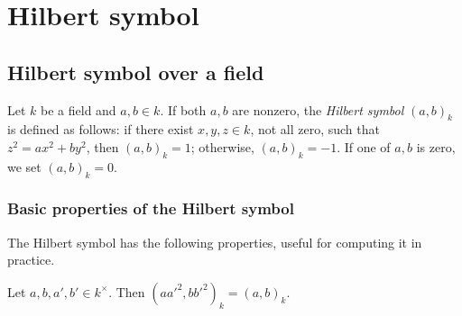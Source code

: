 
%







\printbibliography

\chapter{Hilbert symbol}

\section{Hilbert symbol over a field}

\begin{definition}
	\label{def:Hilbert_symbol}
	\leanok
	Let $k$ be a field and $a, b \in k$. If both $a,b$ are nonzero, the \emph{Hilbert symbol} $(a, b)_k$ is defined as
	follows: if there exist $x, y, z \in k$, not all zero, such that $z^2 = ax^2 + by^2$,
	then $(a, b)_k = 1$; otherwise, $(a, b)_k = -1$. If one of $a,b$ is zero, we set $(a, b)_k = 0$.
\end{definition}


\subsection{Basic properties of the Hilbert symbol}

The Hilbert symbol has the following properties, useful for computing it in practice.

\begin{lemma}
	\label{lem:well_defined_up_to_squares}
	\leanok
Let $a, b, a', b' \in k^\times$. Then $(a a'^2, b b'^2)_k = (a,b)_k$.
\end{lemma}

